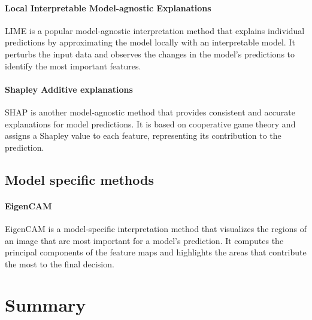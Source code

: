 \documentclass[11pt,a4paper,twoside,openright]{report}  %
\begin{document}
\paragraph{Local Interpretable Model-agnostic Explanations}\label{par:lime}
LIME is a popular model-agnostic interpretation method that explains individual predictions by
approximating the model locally with an interpretable model.
It perturbs the input data and observes the changes in the model's predictions to identify the most
important features.
\paragraph{Shapley Additive explanations}\label{par:shap}
SHAP is another model-agnostic method that provides consistent and accurate explanations for model predictions.
It is based on cooperative game theory and assigns a Shapley value to each feature,
representing its contribution to the prediction.
\subsection{Model specific methods}\label{subsec:model-specific-methods}

\paragraph{EigenCAM}\label{par:eigencam}
EigenCAM is a model-specific interpretation method that visualizes the regions of an image that are most
important for a model's prediction.
It computes the principal components of the feature maps and highlights the areas that contribute the most
to the final decision.



\section*{Summary}
\end{document}
